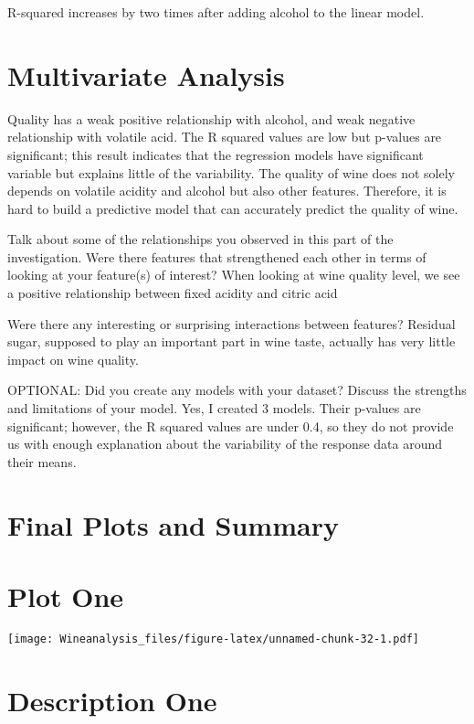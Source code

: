 \documentclass[]{article}
\begin{document}
R-squared increases by two times after adding alcohol to the linear
model.

\section{Multivariate Analysis}\label{multivariate-analysis}

Quality has a weak positive relationship with alcohol, and weak negative
relationship with volatile acid. The R squared values are low but
p-values are significant; this result indicates that the regression
models have significant variable but explains little of the variability.
The quality of wine does not solely depends on volatile acidity and
alcohol but also other features. Therefore, it is hard to build a
predictive model that can accurately predict the quality of wine.

Talk about some of the relationships you observed in this part of the
investigation. Were there features that strengthened each other in terms
of looking at your feature(s) of interest? When looking at wine quality
level, we see a positive relationship between fixed acidity and citric
acid

Were there any interesting or surprising interactions between features?
Residual sugar, supposed to play an important part in wine taste,
actually has very little impact on wine quality.

OPTIONAL: Did you create any models with your dataset? Discuss the
strengths and limitations of your model. Yes, I created 3 models. Their
p-values are significant; however, the R squared values are under 0.4,
so they do not provide us with enough explanation about the variability
of the response data around their means.

\section{Final Plots and Summary}\label{final-plots-and-summary}

\section{Plot One}\label{plot-one}

\texttt{[image: Wineanalysis\_files/figure-latex/unnamed-chunk-32-1.pdf]}

\section{Description One}\label{description-one}
\end{document}

